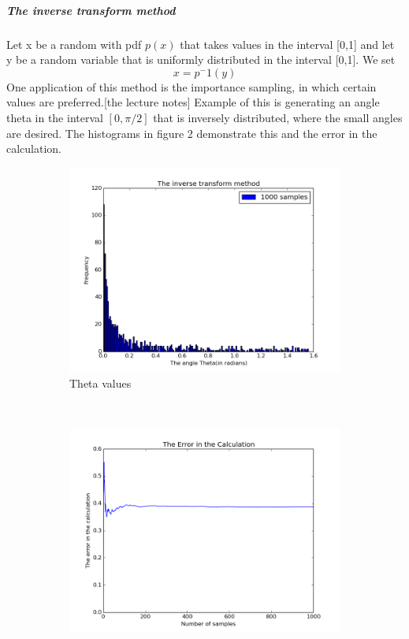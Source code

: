 \documentclass[12pt,a4paper]{article}
\begin{document}
\subparagraph{The inverse transform method} 

Let x be a random with pdf $p(x)$ that takes values in the interval [0,1] and let y be a random variable that is uniformly distributed in the interval [0,1]. We set
\begin{equation}
x = p^-1(y)
\end{equation}
One application of this method is the importance sampling, in which certain values are preferred.[the lecture notes] Example of this is generating an angle theta in the interval $[0,\pi/2]$ that is inversely distributed, where the small angles are desired. The histograms in figure 2 demonstrate this and the error in the calculation.    

\begin{figure}
    \centering
    \begin{subfigure}[b]{0.45\textwidth}
        \includegraphics[width=\textwidth]{inverse_method.png}
        \caption{Theta values}
        \label{fig2}
    \end{subfigure}
    ~ %
    \begin{subfigure}[b]{0.45\textwidth}
        \includegraphics[width=\textwidth]{uncertainity_.png}

\end{subfigure}
\end{figure}
\end{document}
